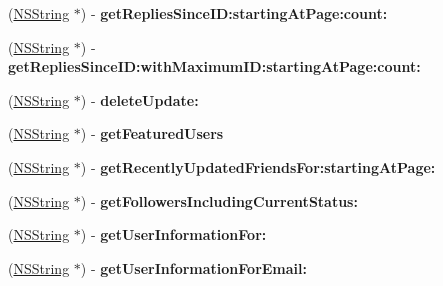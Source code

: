 \begin{DoxyCompactItemize}
\item 
\hypertarget{interface_m_g_twitter_engine_a6993baa657462b92541e9a841d0af0ba}{
(\hyperlink{class_n_s_string}{\-N\-S\-String} $\ast$) -\/ {\bfseries get\-Replies\-Since\-I\-D\-:starting\-At\-Page\-:count\-:}}
\label{interface_m_g_twitter_engine_a6993baa657462b92541e9a841d0af0ba}

\item 
\hypertarget{interface_m_g_twitter_engine_a2c707b99a30991a0ab0757e79fcc7192}{
(\hyperlink{class_n_s_string}{\-N\-S\-String} $\ast$) -\/ {\bfseries get\-Replies\-Since\-I\-D\-:with\-Maximum\-I\-D\-:starting\-At\-Page\-:count\-:}}
\label{interface_m_g_twitter_engine_a2c707b99a30991a0ab0757e79fcc7192}

\item 
\hypertarget{interface_m_g_twitter_engine_af3ce91314c877fff26c166f2e807697d}{
(\hyperlink{class_n_s_string}{\-N\-S\-String} $\ast$) -\/ {\bfseries delete\-Update\-:}}
\label{interface_m_g_twitter_engine_af3ce91314c877fff26c166f2e807697d}

\item 
\hypertarget{interface_m_g_twitter_engine_ae2ab1bbd18e796c760872ee397a75f34}{
(\hyperlink{class_n_s_string}{\-N\-S\-String} $\ast$) -\/ {\bfseries get\-Featured\-Users}}
\label{interface_m_g_twitter_engine_ae2ab1bbd18e796c760872ee397a75f34}

\item 
\hypertarget{interface_m_g_twitter_engine_a3f2e3bf40f1dcad75692d514858d2150}{
(\hyperlink{class_n_s_string}{\-N\-S\-String} $\ast$) -\/ {\bfseries get\-Recently\-Updated\-Friends\-For\-:starting\-At\-Page\-:}}
\label{interface_m_g_twitter_engine_a3f2e3bf40f1dcad75692d514858d2150}

\item 
\hypertarget{interface_m_g_twitter_engine_a4979c32666cd336144161e39bcd0ab64}{
(\hyperlink{class_n_s_string}{\-N\-S\-String} $\ast$) -\/ {\bfseries get\-Followers\-Including\-Current\-Status\-:}}
\label{interface_m_g_twitter_engine_a4979c32666cd336144161e39bcd0ab64}

\item 
\hypertarget{interface_m_g_twitter_engine_a5deec57286dc7d6ad98424ee2d8ae849}{
(\hyperlink{class_n_s_string}{\-N\-S\-String} $\ast$) -\/ {\bfseries get\-User\-Information\-For\-:}}
\label{interface_m_g_twitter_engine_a5deec57286dc7d6ad98424ee2d8ae849}

\item 
\hypertarget{interface_m_g_twitter_engine_a0846bbf1ad1664a885fe9015d7243735}{
(\hyperlink{class_n_s_string}{\-N\-S\-String} $\ast$) -\/ {\bfseries get\-User\-Information\-For\-Email\-:}}
\label{interface_m_g_twitter_engine_a0846bbf1ad1664a885fe9015d7243735}


\end{DoxyCompactItemize}
